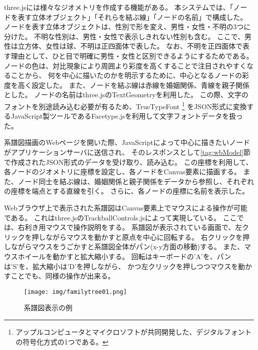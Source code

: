 three.jsには様々なジオメトリを作成する機能がある。
本システムでは、「ノードを表す立体オブジェクト」「それらを結ぶ線」「ノードの名前」で構成した。
ノードを表す立体オブジェクトは、性別で形を変え、男性・女性・不明の3つに分けた。
不明な性別は、男性・女性で表示しきれない性別も含む。
ここで、男性は立方体、女性は球、不明は正四面体で表した。
なお、不明を正四面体で表す理由として、ひと目で明確に男性・女性と区別できるようにするためである。
ノードの色は、対比現象により周囲より彩度を高くすることで注目されやすくなる\cite{chromatics}ことから、
何を中心に描いたのかを明示するために、中心となるノードの彩度を高く設定した。
また、ノードを結ぶ線は赤線を婚姻関係、青線を親子関係とした。
ノードの名前はthree.jsのTextGeometryを利用した。
この際、文字のフォントを別途読み込む必要が有るため、TrueTypeFont
\footnote{アップルコンピュータとマイクロソフトが共同開発した、デジタルフォントの符号化方式の1つである。}
をJSON形式に変換するJavaScript製ツールであるFacetype.js\cite{facetype}を利用して文字フォントデータを扱った。

系譜図描画のWebページを開いた際、JavaScriptによって中心に描きたいノードがアプリケーションサーバに送信され、
そのレスポンスとして\ref{tag:wbModel}節で作成されたJSON形式のデータを受け取り、読み込む。
この座標を利用して、各ノードのジオメトリに座標を設定し、各ノードをCanvas要素に描画する。
また、ノード同士を結ぶ線は、婚姻関係と親子関係をデータから参照し、それぞれの座標を端点とする直線を引く。
さらに、各ノードの座標に名前を表示した。

Webブラウザ上で表示された系譜図はCanvas要素上でマウスによる操作が可能である。
これはthree.jsのTrackballControls.jsによって実現している。
ここでは、右利き用マウスで操作説明をする。
系譜図が表示されている画面で、左クリックを押しながらマウスを動かすと原点を中心に回転する。
右クリックを押しながらマウスをうごかすと系譜図全体がパン(x-y方面の移動)する。
また、マウスホイールを動かすと拡大縮小する。
回転はキーボードの'A'を、パンは'S'を、拡大縮小は'D'を押しながら、
かつ左クリックを押しつつマウスを動かすことでも、同様の操作が出来る。

\begin{figure}[htbp]
    \begin{center}
        \texttt{[image: img/familytree01.png]}
        \caption{系譜図表示の例}
        \label{fig:familytree}
    \end{center}
\end{figure}